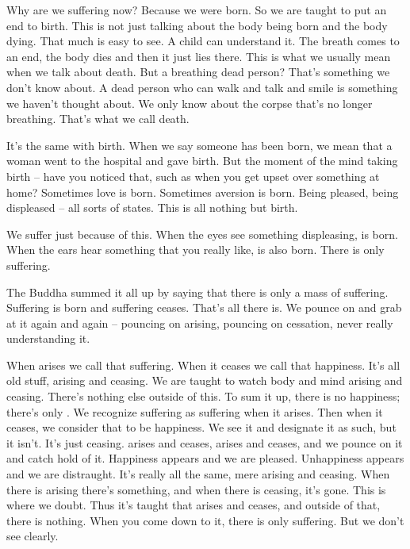 Why are we suffering now? Because we were born. So we are taught to put an end to birth. This is not just talking about the body being born and the body dying. That much is easy to see. A child can understand it. The breath comes to an end, the body dies and then it just lies there. This is what we usually mean when we talk about death. But a breathing dead person? That's something we don't know about. A dead person who can walk and talk and smile is something we haven't thought about. We only know about the corpse that's no longer breathing. That's what we call death. 

It's the same with birth. When we say someone has been born, we mean that a woman went to the hospital and gave birth. But the moment of the mind taking birth -- have you noticed that, such as when you get upset over something at home? Sometimes love is born. Sometimes aversion is born. Being pleased, being displeased -- all sorts of states. This is all nothing but birth. 

We suffer just because of this. When the eyes see something displeasing,  is born. When the ears hear something that you really like,  is also born. There is only suffering. 

The Buddha summed it all up by saying that there is only a mass of suffering. Suffering is born and suffering ceases. That's all there is. We pounce on and grab at it again and again -- pouncing on arising, pouncing on cessation, never really understanding it. 

When  arises we call that suffering. When it ceases we call that happiness. It's all old stuff, arising and ceasing. We are taught to watch body and mind arising and ceasing. There's nothing else outside of this. To sum it up, there is no happiness; there's only . We recognize suffering as suffering when it arises. Then when it ceases, we consider that to be happiness. We see it and designate it as such, but it isn't. It's just  ceasing.  arises and ceases, arises and ceases, and we pounce on it and catch hold of it. Happiness appears and we are pleased. Unhappiness appears and we are distraught. It's really all the same, mere arising and ceasing. When there is arising there's something, and when there is ceasing, it's gone. This is where we doubt. Thus it's taught that  arises and ceases, and outside of that, there is nothing. When you come down to it, there is only suffering. But we don't see clearly. 

